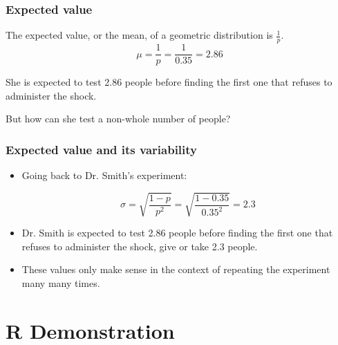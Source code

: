 \documentclass[slidestop,compress,mathserif]{beamer}
\begin{document}
\begin{frame}
\frametitle{Expected value}


The expected value, or the mean, of a geometric distribution is $\frac{1}{p}$.
\[ \mu = \frac{1}{p} = \frac{1}{0.35} = 2.86 \]

\pause

She is expected to test 2.86 people before finding the first one that refuses to administer the shock. 

\pause

But how can she test a non-whole number of people?

\end{frame}


\begin{frame}
\frametitle{Expected value and its variability}


\pause

\begin{itemize}

\item Going back to Dr. Smith's experiment:

\[ \sigma = \sqrt{\frac{1-p}{p^2}} = \sqrt{\frac{1-0.35}{0.35^2}} = 2.3 \]

\pause

\item Dr. Smith is expected to test 2.86 people before finding the first one that refuses to administer the shock, give or take 2.3 people.

\pause

\item These values only make sense in the context of repeating the experiment many many times.

\end{itemize}

\end{frame}


\section{R Demonstration}
\end{document}
